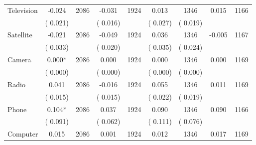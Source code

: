 \begin{tabular}{l*{8}{c}}
Television        &             -0.024      &       2086       &             -0.031      &       1924       &              0.013      &       1346  &        0.015 &       1166       \\
                       &       (       0.021)            &                               &       (       0.016)            &                               &       (       0.027)            &       (       0.019) &                  \\
Satellite        &             -0.021      &       2086       &             -0.049      &       1924       &              0.036      &       1346  &       -0.005 &       1167       \\
                       &       (       0.033)            &                               &       (       0.020)            &                               &       (       0.035)            &       (       0.024) &                  \\
Camera        &              0.000*      &       2086       &              0.000      &       1924       &              0.000      &       1346  &        0.000 &       1169       \\
                       &       (       0.000)            &                               &       (       0.000)            &                               &       (       0.000)            &       (       0.000) &                  \\
Radio        &              0.041      &       2086       &             -0.016      &       1924       &              0.055      &       1346  &        0.011 &       1169       \\
                       &       (       0.015)            &                               &       (       0.015)            &                               &       (       0.022)            &       (       0.019) &                  \\
Phone        &              0.104*      &       2086       &              0.037      &       1924       &              0.090      &       1346  &        0.090 &       1166       \\
                       &       (       0.091)            &                               &       (       0.062)            &                               &       (       0.111)            &       (       0.076) &                  \\
Computer        &              0.015      &       2086       &              0.001      &       1924       &              0.012      &       1346  &        0.017 &       1169       \\

\end{tabular}
